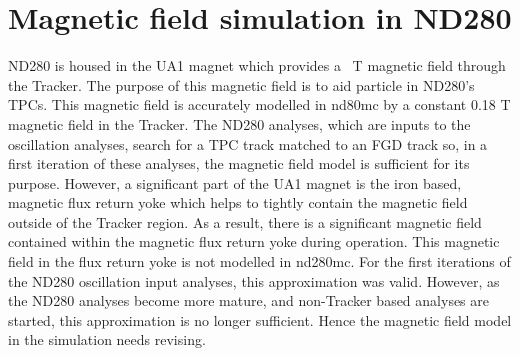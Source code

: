 \chapter{Magnetic field simulation in ND280}
\label{chap:MagneticFieldSimulation}
ND280 is housed in the  UA1 magnet which provides a ~T magnetic field through the Tracker.  The purpose of this magnetic field is to aid particle   in ND280's TPCs.  This magnetic field is accurately modelled in nd80mc by a constant 0.18 T magnetic field in the Tracker.  The ND280 analyses, which are inputs to the oscillation analyses, search for a TPC track matched to an FGD track so, in a first iteration of these analyses, the magnetic field model is sufficient for its purpose.
\newline
\newline
However, a significant part of the UA1 magnet is the iron based, magnetic flux return yoke which helps to tightly contain the magnetic field outside of the Tracker region.  As a result, there is a significant magnetic field contained within the magnetic flux return yoke during operation.  This magnetic field in the flux return yoke is not modelled in nd280mc.  For the first iterations of the ND280 oscillation input analyses, this approximation was valid.  However, as the ND280 analyses become more mature, and non-Tracker based analyses are started, this approximation is no longer sufficient.  Hence the magnetic field model in the simulation needs revising.
\newline
\newline
{}


